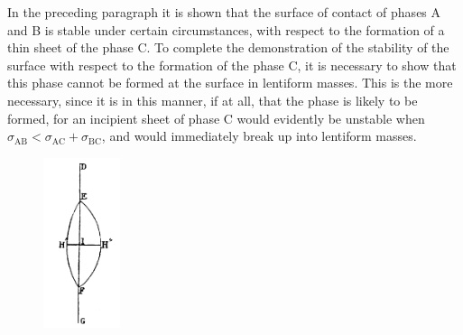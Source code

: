 \documentclass[12pt]{memoir}
\begin{document}
{In the preceding paragraph it is shown that the surface of contact of phases A and B is stable under certain circumstances, with respect to the formation of a thin sheet of the phase C. To complete the demonstration of the stability of the surface with respect to the formation of the phase C, it is necessary to show that this phase cannot be formed at the surface in lentiform masses. This is the more necessary, since it is in this manner, if at all, that the phase is likely to be formed, for an incipient sheet of phase C would evidently be unstable when $\sigma_{\text{AB}} < \sigma_{\text{AC}} + \sigma_{\text{BC}}$, and would immediately break up into lentiform masses.

\begin{figure} %
    \centering
    \includegraphics[width=0.2\textwidth]{fig_10}
    \caption{ }
    \label{fig_10}
\end{figure}

}
\end{document}
